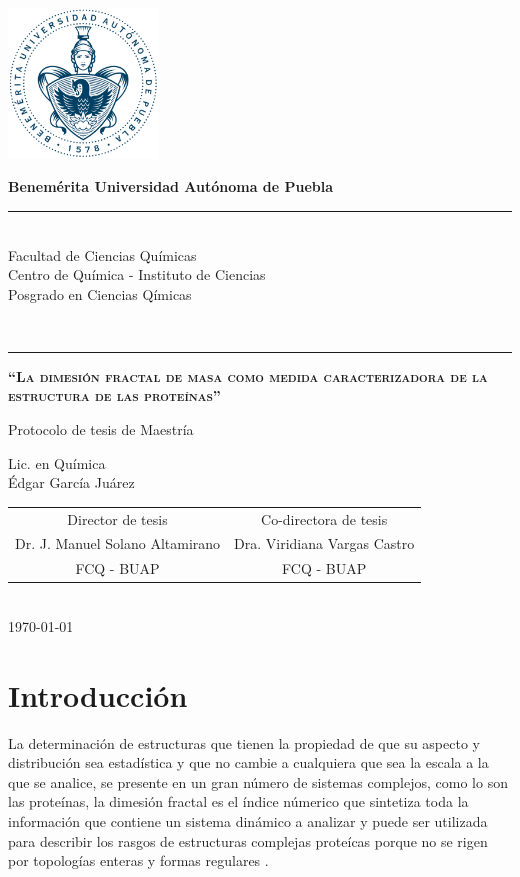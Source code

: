 \documentclass[11pt]{article}
\newcommand\vtab[1][0.5cm]{\vspace*{#1}}
\begin{document}
\pagestyle{empty} 
\phantom{a}
\vspace{-1.4cm}
\begin{center}
\includegraphics[width=4cm]{buap.pdf}

\Large{\textbf{Benemérita Universidad Autónoma de Puebla}\\
\rule{150mm}{0.1mm}\\
Facultad de Ciencias Químicas\\
Centro de Química - Instituto de Ciencias\\
Posgrado en Ciencias Qímicas}\\
\rule{150mm}{0.1mm}

\vtab[.1cm]
{\scshape\large \textbf{``La dimesión fractal  de masa como medida caracterizadora de la estructura de las proteínas''} \par}
\vtab[.1cm]
\Large{Protocolo de tesis de Maestría}\\
\vtab[0.2cm]

Lic. en Química \\
Édgar García Juárez \\
\vtab[0.5cm]
\begin{tabular}{cc}
\vtab[10mm]
Director de tesis & Co-directora de tesis \\
Dr. J. Manuel Solano Altamirano & Dra. Viridiana Vargas Castro \\ 
FCQ - BUAP & FCQ - BUAP \\ 
\end{tabular} 
\vtab[1cm] \\
{\today}
\end{center}

\clearpage

\section{Introducción}

La determinación de estructuras que tienen la propiedad de que su aspecto y distribución sea estadística y que no cambie a cualquiera que sea la escala a la que se analice, se presente en un gran número de sistemas complejos, como lo son las proteínas, la dimesión fractal es el índice númerico que sintetiza toda la información que contiene un sistema dinámico a analizar y puede ser utilizada para describir los rasgos de estructuras  complejas proteícas porque no se rigen por topologías enteras y formas regulares \cite{Mandelbrot1997}. 
\end{document}
